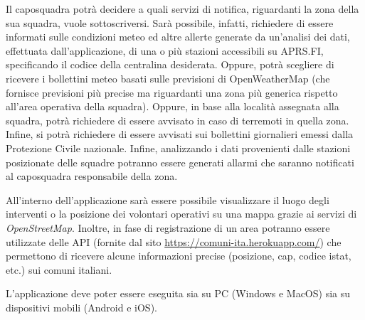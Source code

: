 Il caposquadra potrà decidere a quali servizi di notifica, riguardanti la zona della sua squadra, vuole sottoscriversi. Sarà possibile, infatti, richiedere di essere informati sulle condizioni meteo ed altre allerte generate da un’analisi dei dati, effettuata dall'applicazione, di una o più stazioni accessibili su APRS.FI, specificando il codice della centralina desiderata. Oppure, potrà scegliere di ricevere i bollettini meteo basati sulle previsioni di OpenWeatherMap (che fornisce previsioni più precise ma riguardanti una zona più generica rispetto all’area operativa della squadra). Oppure, in base alla località assegnata alla squadra, potrà richiedere di essere avvisato in caso di terremoti in quella zona. Infine, si potrà richiedere di essere avvisati sui bollettini giornalieri emessi dalla Protezione Civile nazionale. Infine, analizzando i dati provenienti dalle stazioni posizionate delle squadre potranno essere generati allarmi che saranno notificati al caposquadra responsabile della zona.

All’interno dell’applicazione sarà essere possibile visualizzare il luogo degli interventi o la posizione dei volontari operativi su una mappa grazie ai servizi di \textit{OpenStreetMap}. Inoltre, in fase di registrazione di un area potranno essere utilizzate delle API (fornite dal sito \url{https://comuni-ita.herokuapp.com/}) che permettono di ricevere alcune informazioni precise (posizione, cap, codice istat, etc.) sui comuni italiani.

L’applicazione deve poter essere eseguita sia su PC (Windows e MacOS) sia su dispositivi mobili (Android e iOS). 